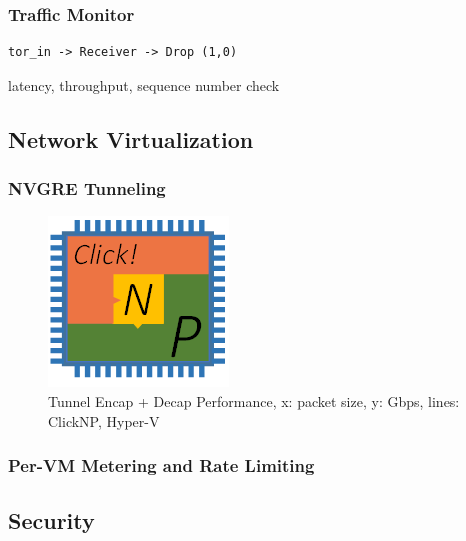 {\subsubsection{Traffic Monitor}

\begin{lstlisting}
tor_in -> Receiver -> Drop (1,0)
\end{lstlisting}

latency, throughput, sequence number check

\subsection{Network Virtualization}

\subsubsection{NVGRE Tunneling}

\begin{figure}[h!]
	\centering
	\includegraphics[width=0.6\columnwidth]{image/logo}
	\vspace{-0.15in}
	\caption{Tunnel Encap + Decap Performance, x: packet size, y: Gbps, lines: ClickNP, Hyper-V}
	\vspace{-0.15in}
	\label{clicknp:fig:NVGREPerformance}
\end{figure}

\subsubsection{Per-VM Metering and Rate Limiting}

\subsection{Security}

}
